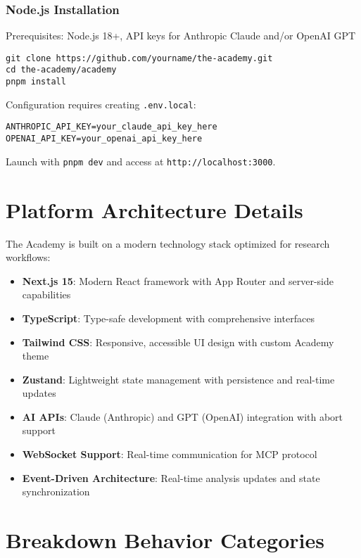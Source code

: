 \documentclass[11pt,letterpaper]{article}
\newcommand{\theacademy}{The Academy}
\begin{document}
\subsubsection{Node.js Installation}
Prerequisites: Node.js 18+, API keys for Anthropic Claude and/or OpenAI GPT

\begin{verbatim}
git clone https://github.com/yourname/the-academy.git
cd the-academy/academy
pnpm install
\end{verbatim}

Configuration requires creating \texttt{.env.local}:
\begin{verbatim}
ANTHROPIC_API_KEY=your_claude_api_key_here
OPENAI_API_KEY=your_openai_api_key_here
\end{verbatim}

Launch with \texttt{pnpm dev} and access at \texttt{http://localhost:3000}.

\section{Platform Architecture Details}
\label{app:architecture}

\theacademy{} is built on a modern technology stack optimized for research workflows:

\begin{itemize}
    \item \textbf{Next.js 15}: Modern React framework with App Router and server-side capabilities
    \item \textbf{TypeScript}: Type-safe development with comprehensive interfaces
    \item \textbf{Tailwind CSS}: Responsive, accessible UI design with custom Academy theme
    \item \textbf{Zustand}: Lightweight state management with persistence and real-time updates
    \item \textbf{AI APIs}: Claude (Anthropic) and GPT (OpenAI) integration with abort support
    \item \textbf{WebSocket Support}: Real-time communication for MCP protocol
    \item \textbf{Event-Driven Architecture}: Real-time analysis updates and state synchronization
\end{itemize}

\section{Breakdown Behavior Categories}
\label{app:breakdown}
\end{document}
